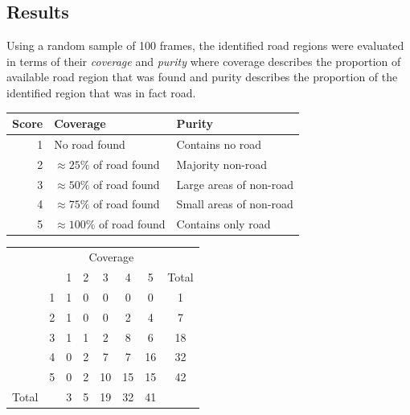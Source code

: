 \documentclass[10pt]{article}
\begin{document}
\subsection *{Results}
    Using a random sample of 100 frames, the identified road regions were evaluated in terms of their \textit{coverage} and \textit{purity} where coverage describes the proportion of available road region that was found and purity describes the proportion of the identified region that was in fact road. \\
   \begin{center}
        \begin{tabular}{ r |l | l}
            Score & Coverage & Purity\\
            \hline
            1 & No road found & Contains no road \\
            \hline
            2 & $\approx 25\%$ of road found  & Majority non-road \\
            \hline
            3 & $\approx 50\%$ of road found  & Large areas of non-road\\
            \hline
            4 & $\approx 75\%$ of road found  & Small areas of non-road \\
            \hline
            5 & $\approx 100\%$ of road found & Contains only road\\
        \end{tabular}
    \end{center}


    
    \begin{center}
        \begin{tabular}{ cc|ccccc|c }
            &&\multicolumn{5}{c}{Coverage}&  \\
            && 1 & 2 & 3 & 4 & 5 & Total\\
            \hline
            \parbox[t]{2mm}{}&1& 1 & 0 & 0 & 0 & 0 & 1\\
            &2 & 1& 0 & 0 & 2 & 4 & 7\\
            &3& 1& 1 & 2 & 8 & 6 & 18\\
            &4&0 & 2 & 7 & 7 & 16 & 32 \\
            &5 & 0 & 2 & 10 & 15 & 15 & 42 \\
            \hline
            Total & & 3 & 5 & 19 & 32 & 41 &  \\


        \end{tabular}
    \end{center}
\end{document}
